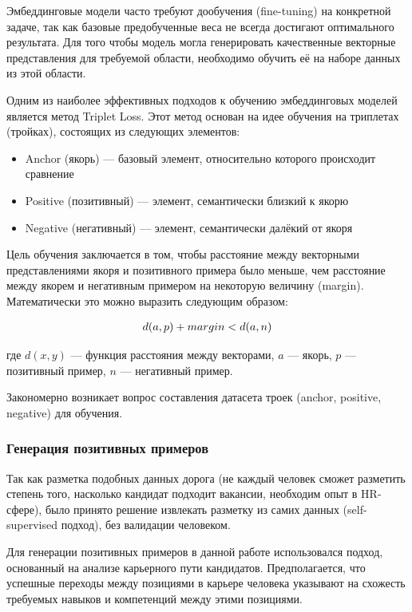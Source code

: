 \documentclass[14pt]{mmcs_article}
\begin{document}
Эмбеддинговые модели часто требуют дообучения (fine-tuning) на конкретной задаче, так как базовые предобученные веса не всегда достигают оптимального результата. Для того чтобы модель могла генерировать качественные векторные представления для требуемой области, необходимо обучить её на наборе данных из этой области.

Одним из наиболее эффективных подходов к обучению эмбеддинговых моделей является метод Triplet Loss. Этот метод основан на идее обучения на триплетах (тройках), состоящих из следующих элементов:
\begin{itemize}
  \item Anchor (якорь) --- базовый элемент, относительно которого происходит сравнение
  \item Positive (позитивный) --- элемент, семантически близкий к якорю
  \item Negative (негативный) --- элемент, семантически далёкий от якоря
\end{itemize}

Цель обучения заключается в том, чтобы расстояние между векторными представлениями якоря и позитивного примера было меньше, чем расстояние между якорем и негативным примером на некоторую величину (margin). Математически это можно выразить следующим образом:

\begin{equation*}
  \centering
  \allowdisplaybreaks[1]
  \begin{split}
    d(a,p) + margin < d(a,n)
  \end{split}
\end{equation*}

где $d(x,y)$ --- функция расстояния между векторами, $a$ --- якорь, $p$ --- позитивный пример, $n$ --- негативный пример.

Закономерно возникает вопрос составления датасета троек (anchor, positive, negative) для обучения.

\subsubsection{Генерация позитивных примеров}\label{positive_examples_generation}

Так как разметка подобных данных дорога (не каждый человек сможет разметить степень того, насколько кандидат подходит вакансии, необходим опыт в HR-сфере), было принято решение извлекать разметку из самих данных (self-supervised подход), без валидации человеком.

Для генерации позитивных примеров в данной работе использовался подход, основанный на анализе карьерного пути кандидатов. Предполагается, что успешные переходы между позициями в карьере человека указывают на схожесть требуемых навыков и компетенций между этими позициями.
\end{document}

